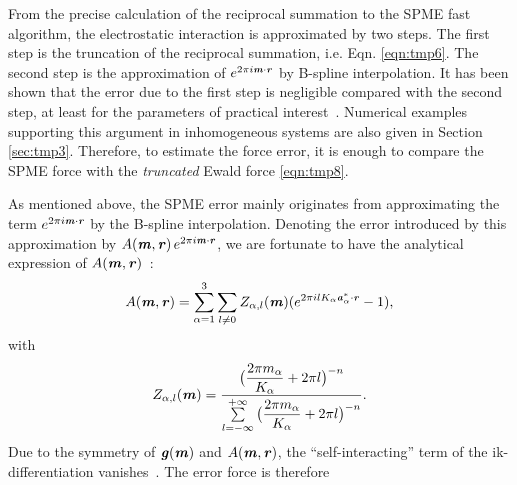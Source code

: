 \documentclass[aps,pre,preprint,unsortedaddress]{revtex4}
\newcommand{\redc}[1]{{\color{red} #1}}
\renewcommand{\v}[1]{\textbf{\textit{#1}}}
\begin{document}
From the precise calculation of the reciprocal summation to the SPME
fast algorithm, the electrostatic interaction is approximated by two
steps.  The first step is the truncation of the reciprocal summation,
i.e. Eqn. \eqref{eqn:tmp6}. The second step is the approximation of
$e^{2\pi i\v m\cdot\v r}$ by B-spline
interpolation. It has been shown that the
error due to the first step is negligible \redc{compared} with the second
step,
at least for the parameters of practical interest~\cite{wang2010optimizing}.
Numerical
examples supporting this argument in inhomogeneous systems are also
given in Section \ref{sec:tmp3}.  Therefore, to estimate the force
error, it is enough to compare the SPME force with the
\emph{truncated} Ewald force \eqref{eqn:tmp8}. 

As mentioned above, the SPME error mainly originates from approximating
the term $e^{2\pi i\v m\cdot\v r}$ by the B-spline
interpolation. Denoting the error introduced by this approximation by
$A(\v m, \v r)\,e^{2\pi i\v m\cdot \v r}$, we are fortunate to have
the analytical expression of $A(\v m, \v r)$~\cite{schoenberg1987cardinal}:
\begin{align}\label{eqn:error-A}
  A(\v m, \v r)
  =
  \sum_{\alpha=1}^3\sum_{l\neq 0}
  Z_{\alpha,l}(\v m)
  (
  e^{2\pi i l K_\alpha\v a^\ast_\alpha\cdot \v r} - 1
  ),
\end{align}
with
\begin{align}
  Z_{\alpha,l}(\v m) = \frac
  {\big(\dfrac{2\pi m_\alpha}{K_\alpha} + 2\pi l\big)^{-n}}
  {\sum\limits_{l=-\infty}^{+\infty}
    \big(\dfrac{2\pi m_\alpha}{K_\alpha} + 2\pi l\big)^{-n}}.
\end{align}
Due to the symmetry of $\v g(\v m)$ and $A(\v m, \v r)$, the
``self-interacting'' term of the
ik-differentiation vanishes~\cite{wang2010optimizing}.
The error force is therefore
\end{document}
